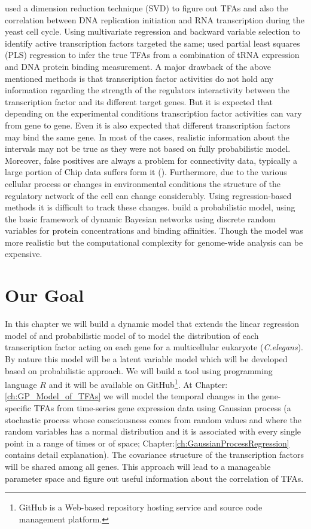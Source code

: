 \cite{Alter:2004} used a dimension reduction technique (SVD) to figure out TFAs and also the correlation between DNA replication initiation and RNA transcription during the yeast cell cycle. Using multivariate regression and backward variable selection to identify active transcription factors \cite{Gao:2004} targeted the same; \cite{Boulesteix:2005} used partial least squares (PLS) regression to infer the true TFAs from a combination of tRNA expression and DNA protein binding measurement. A major drawback of the above mentioned methods is that transcription factor activities do not hold any information regarding the strength of the regulators interactivity between the transcription factor and its different target genes. But it is expected that depending on the experimental conditions transcription factor activities can vary from gene to gene. Even it is also expected that different transcription factors may bind the same gene. In most of the cases, realistic information about the intervals may not be true as they were not based on fully probabilistic model. Moreover, false positives are always a problem for connectivity data, typically a large portion of Chip data suffers form it (\cite{Boulesteix:2005}). Furthermore, due to the various cellular process or changes in environmental conditions the structure of the regulatory network of the cell can change considerably. Using regression-based methods it is difficult to track these changes. \cite{Nachman:2004} build a probabilistic model, using the basic framework of dynamic Bayesian networks using discrete random variables for protein concentrations and binding affinities. Though the model was more realistic but the computational complexity for genome-wide analysis can be expensive.

\section{Our Goal}
In this chapter we will build a dynamic model that extends the linear regression model of \cite{Liao:2003} and probabilistic model of \cite{Sanguinetti:2006} to model the distribution of each transcription factor acting on each gene for a multicellular eukaryote (\textit{C.elegans}). By nature this model will be a latent variable model which will be developed based on probabilistic approach. We will build a tool using programming language $R$ and it will be available on GitHub\footnote{GitHub is a Web-based repository hosting service and source code management platform.}. At Chapter:\ref{ch:GP_Model_of_TFAs} we will model the temporal changes in the gene-specific TFAs from time-series gene expression data using Gaussian process (a stochastic process whose consciousness comes from random values and where the random variables has a normal distribution and it is associated with every single point in a range of times or of space; Chapter:\ref{ch:GaussianProcessRegression} contains detail explanation). The covariance structure of the transcription factors will be shared among all genes. This approach will lead to a manageable parameter space and figure out useful information about the correlation of TFAs.

